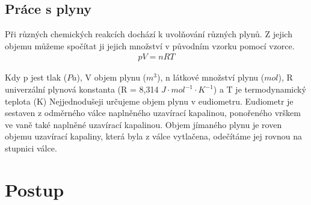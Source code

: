 \documentclass[13pt, a4paper, twoside]{article}z
\begin{document}
\subsection*{Práce s plyny}
Při různých chemických reakcích dochází k uvolňování různých plynů. Z jejich objemu můžeme spočítat ji jejich množství v původním vzorku pomocí vzorce.
\begin{align*}
    pV=nRT
\end{align*}

Kdy p jest tlak ($Pa$), V objem plynu ($m^3$), n látkové množství plynu ($mol$), R univerzální plynová konstanta  (R = 8,314 $J\cdot mol^{-1}\cdot K^{-1}$) a T je termodynamický teplota (K)
Nejjednodušeji určujeme objem plynu v eudiometru. Eudiometr je sestaven z odměrného válce naplněného uzavírací kapalinou, ponořeného vrškem ve vaně také naplněné uzavírací kapalinou. Objem jímaného plynu je roven objemu uzavírací kapaliny, která byla z válce vytlačena, odečítáme jej rovnou na stupnici válce.

\section*{Postup}
\end{document}
